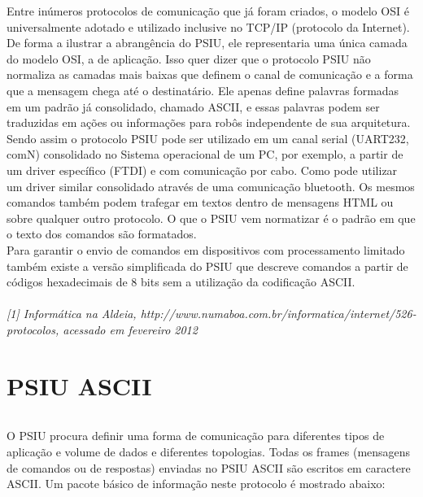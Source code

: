 \documentclass[11pt,	 papera4]{article}
\begin{document}
Entre inúmeros protocolos de comunicação que já foram criados, o modelo OSI é universalmente adotado e utilizado inclusive no TCP/IP (protocolo da Internet). De forma a ilustrar a abrangência do PSIU, ele representaria uma única camada do modelo OSI, a de aplicação. Isso quer dizer que o protocolo PSIU não normaliza as camadas mais baixas que definem o canal de comunicação e a forma que a mensagem chega até o destinatário. Ele apenas define palavras formadas em um padrão já consolidado, chamado ASCII, e essas palavras podem ser traduzidas em ações ou informações para robôs independente de sua arquitetura.\\

Sendo assim o protocolo PSIU pode ser utilizado em um canal serial (UART232, comN) consolidado no Sistema operacional de um PC, por exemplo, a partir de um driver específico (FTDI) e com comunicação por cabo. Como pode utilizar um driver similar consolidado através de uma comunicação bluetooth. Os mesmos comandos também podem trafegar em textos dentro de mensagens HTML ou sobre qualquer outro protocolo. O que o PSIU vem normatizar é o padrão em que o texto dos comandos são formatados.\\

Para garantir o envio de comandos em dispositivos com processamento limitado também existe a versão simplificada do PSIU que descreve comandos a partir de códigos hexadecimais de 8 bits sem a utilização da codificação ASCII. \\ \\

\textsl{[1] Informática na Aldeia, http://www.numaboa.com.br/informatica/internet/526-protocolos, acessado em fevereiro 2012}



\newpage




\part*{PSIU ASCII\newline}

\paragraph{} O PSIU procura definir uma forma de comunicação para diferentes tipos
de aplicação e volume de dados e diferentes topologias. Todas os frames (mensagens de comandos ou de respostas) enviadas no PSIU ASCII são escritos em caractere ASCII. Um pacote básico de
informação neste protocolo é mostrado abaixo: \\
\end{document}
